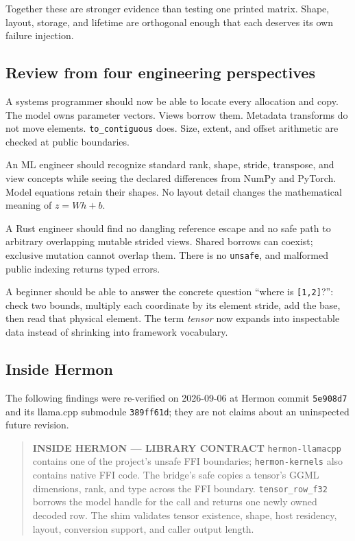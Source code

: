\documentclass[
  10pt,
]{article}
\begin{document}
Together these are stronger evidence than testing one printed matrix.
Shape, layout, storage, and lifetime are orthogonal enough that each
deserves its own failure injection.

\subsection{Review from four engineering
perspectives}\label{review-from-four-engineering-perspectives}

A systems programmer should now be able to locate every allocation and
copy. The model owns parameter vectors. Views borrow them. Metadata
transforms do not move elements. \texttt{to\_contiguous} does. Size,
extent, and offset arithmetic are checked at public boundaries.

An ML engineer should recognize standard rank, shape, stride, transpose,
and view concepts while seeing the declared differences from NumPy and
PyTorch. Model equations retain their shapes. No layout detail changes
the mathematical meaning of \(z=Wh+b\).

A Rust engineer should find no dangling reference escape and no safe
path to arbitrary overlapping mutable strided views. Shared borrows can
coexist; exclusive mutation cannot overlap them. There is no
\texttt{unsafe}, and malformed public indexing returns typed errors.

A beginner should be able to answer the concrete question ``where is
\texttt{{[}1,2{]}}?'': check two bounds, multiply each coordinate by its
element stride, add the base, then read that physical element. The term
\emph{tensor} now expands into inspectable data instead of shrinking
into framework vocabulary.

\subsection{Inside Hermon}\label{inside-hermon-1}

The following findings were re-verified on 2026-09-06 at Hermon commit
\texttt{5e908d7} and its llama.cpp submodule \texttt{389ff61d}; they are
not claims about an uninspected future revision.

\begin{quote}
\textbf{INSIDE HERMON --- LIBRARY CONTRACT} \texttt{hermon-llamacpp}
contains one of the project's unsafe FFI boundaries;
\texttt{hermon-kernels} also contains native FFI code. The bridge's safe
\texttt{} copies a tensor's GGML
dimensions, rank, and type across the FFI boundary.
\texttt{tensor\_row\_f32} borrows the model handle for the call and
returns one newly owned decoded row. The shim validates tensor
existence, shape, host residency, layout, conversion support, and caller
output length.
\end{quote}
\end{document}
